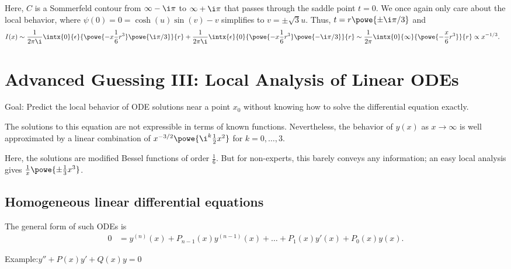 \documentclass[english, parskip=full]{scrbook}
\newcommand{\note}[1]{\begin{tcolorbox}[colback=colorbackgroundnote,colframe=colornote, breakable,enhanced]#1\end{tcolorbox}}
\newcommand{\example}[3]{\begin{tcolorbox}[colback=colorbackgroundexample,colframe=colorexample, breakable,enhanced,title={\textbf{#1}: #2.}]#3\end{tcolorbox}}
\begin{document}
\example{Hyperbolic linear shift}{$I(x)=\frac{1}{2\pi\i}\intx{C}{ }{\powe{x\kla*{\sinh(t)-t}}}{t}$ as $x\rightarrow\infty$}{Here, $C$ is a Sommerfeld contour from $\infty-\i\pi$ to $\infty+\i\pi$ that passes through the saddle point $t=0$.
We once again only care about the local behavior, where $\psi(0)=0=\cosh(u)\sin(v)-v$ simplifies to $v=\pm \sqrt{3}u$.
Thus, $t=r\powe{\pm\i \pi/3}$ and
\begin{align}
I(x) &\sim \frac{1}{2\pi\i} \intx{0}{\epsilon}{ \powe{-x\frac{1}{6}r^3} \powe{\i\pi/3}}{r} + \frac{1}{2\pi\i} \intx{\epsilon}{0}{\powe{-x\frac{1}{6}r^3} \powe{-\i\pi/3}}{r} \sim \frac{1}{2\pi} \intx{0}{\infty}{\powe{-\frac{x}{6}r^3}}{r} \propto x^{-1/3}.
\end{align}
}
\chapter{Advanced Guessing III: Local Analysis of Linear ODEs}
Goal: Predict the local behavior of ODE solutions near a point $x_0$ without knowing how to solve the differential equation exactly.
\example{Hard anharmonic oscillator}{$y^{(4)}=\kla*{x^4+\sin(x)}y$}{The solutions to this equation are not expressible in terms of known functions.
Nevertheless, the behavior of $y(x)$ as $x\rightarrow\infty$ is well approximated by a linear combination of $x^{-3/2} \powe{\i^k \frac{1}{2}x^2}$ for $k=0,\dots,3$.
}
\example{Anharmonic oscillator}{$y''=x^4y$}{Here, the solutions are modified Bessel functions of order $\frac{1}{6}$.
But for non-experts, this barely conveys any information; an easy local analysis gives $\frac{1}{x} \powe{\pm \frac{1}{3}x^3}$.
}
\section{Homogeneous linear differential equations}
The general form of such ODEs is
\begin{align}
0 &= y^{(n)}(x) + P_{n-1}(x)y^{(n-1)}(x) + \dots + P_1(x) y'(x) + P_0(x)y(x).
\end{align}
\note{Example:$y''+P(x)y'+Q(x)y=0$}
\end{document}

